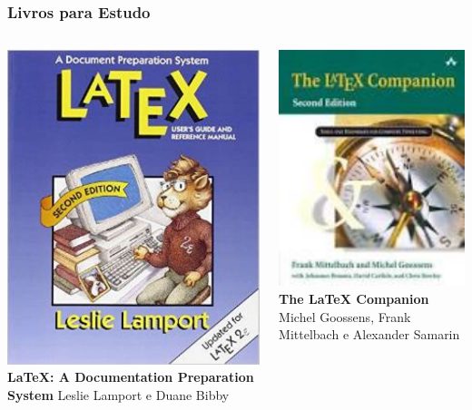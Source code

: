 \begin{frame}
\frametitle{Livros para Estudo}

\begin{columns}
\includegraphics[scale=.15]{../img/livro1.pdf}  \textbf{LaTeX: A Documentation Preparation System}
Leslie Lamport e Duane Bibby 

 \includegraphics[scale=.3]{../img/livro2.pdf}  \textbf{The LaTeX
Companion} Michel Goossens, Frank Mittelbach e Alexander Samarin 


\end{columns}
\end{frame}
